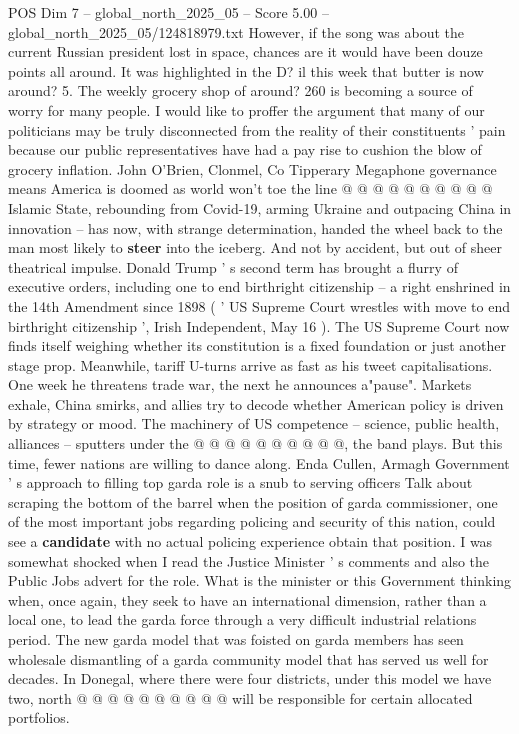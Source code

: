 \begin{textsample}{POS Dim 7 – global\_north\_2025\_05 – Score 5.00 – global\_north\_2025\_05/124818979.txt}
However, if the song was about the current Russian president lost in space, chances are it would have been douze points all around.
It was highlighted in the D? il this week that butter is now around? 5.
The weekly grocery shop of around? 260 is becoming a source of worry for many people.
I would like to proffer the argument that many of our politicians may be truly disconnected from the reality of their constituents ' pain because our public representatives have had a pay rise to cushion the blow of grocery inflation.
John O'Brien, Clonmel, Co Tipperary Megaphone governance means America is doomed as world won't toe the line @ @ @ @ @ @ @ @ @ @ Islamic State, rebounding from Covid-19, arming Ukraine and outpacing China in innovation -- has now, with strange determination, handed the wheel back to the man most likely to \textbf{steer} into the iceberg.
And not by accident, but out of sheer theatrical impulse.
Donald Trump ' s second term has brought a flurry of executive orders, including one to end birthright citizenship -- a right enshrined in the 14th Amendment since 1898 ( ' US Supreme Court wrestles with move to end birthright citizenship ', Irish Independent, May 16 ).
The US Supreme Court now finds itself weighing whether its constitution is a fixed foundation or just another stage prop.
Meanwhile, tariff U-turns arrive as fast as his tweet capitalisations.
One week he threatens trade war, the next he announces a"pause".
Markets exhale, China smirks, and allies try to decode whether American policy is driven by strategy or mood.
The machinery of US competence -- science, public health, alliances -- sputters under the @ @ @ @ @ @ @ @ @ @, the band plays.
But this time, fewer nations are willing to dance along.
Enda Cullen, Armagh Government ' s approach to filling top garda role is a snub to serving officers Talk about scraping the bottom of the barrel when the position of garda commissioner, one of the most important jobs regarding policing and security of this nation, could see a \textbf{candidate} with no actual policing experience obtain that position.
I was somewhat shocked when I read the Justice Minister ' s comments and also the Public Jobs advert for the role.
What is the minister or this Government thinking when, once again, they seek to have an international dimension, rather than a local one, to lead the garda force through a very difficult industrial relations period.
The new garda model that was foisted on garda members has seen wholesale dismantling of a garda community model that has served us well for decades.
In Donegal, where there were four districts, under this model we have two, north @ @ @ @ @ @ @ @ @ @ will be responsible for certain allocated portfolios.

\end{textsample}
